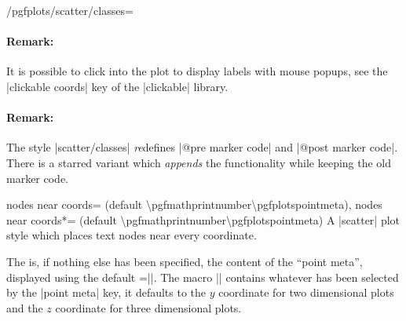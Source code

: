 {\begin{stylekey}{/pgfplots/scatter/classes=}


    \paragraph{Remark:}

    It is possible to click into the plot to display labels with mouse popups,
    see the |clickable coords| key of the |clickable| library.

    \paragraph{Remark:}

    The style |scatter/classes| \emph{re}defines |@pre marker code| and
    |@post marker code|. There is a starred variant
     which \emph{appends} the functionality
    while keeping the old marker code.
\end{stylekey}

\begin{pgfplotskeylist}{%
    nodes near coords= (default \textbackslash pgfmathprintnumber\textbackslash pgfplotspointmeta),
    nodes near coords*= (default \textbackslash pgfmathprintnumber\textbackslash pgfplotspointmeta)%
}
    A |scatter| plot style which places text nodes near every coordinate.

\begin{codeexample}[]
\end{codeexample}
    The  is, if nothing else has been specified, the content of
    the ``point meta'', displayed using the default
    =|\pgfmathprintnumber{\pgfplotspointmeta}|. The macro
    |\pgfplotspointmeta| contains whatever has been selected by the
    |point meta| key, it defaults to the $y$ coordinate for two dimensional
    plots and the $z$ coordinate for three dimensional plots.


\end{pgfplotskeylist}}
